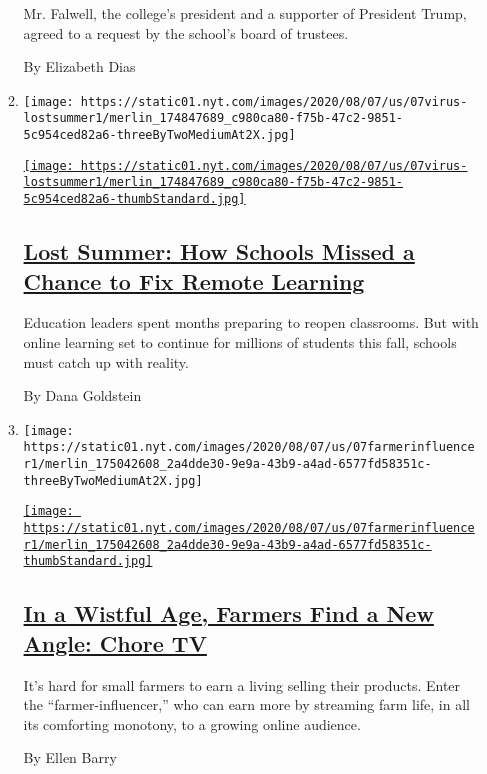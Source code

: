 \begin{enumerate}
\begin{enumerate}
    Mr. Falwell, the college's president and a supporter of President
    Trump, agreed to a request by the school's board of trustees.

    By Elizabeth Dias
  \item
    \texttt{[image: https://static01.nyt.com/images/2020/08/07/us/07virus-lostsummer1/merlin\_174847689\_c980ca80-f75b-47c2-9851-5c954ced82a6-threeByTwoMediumAt2X.jpg]}

    \href{/2020/08/07/us/remote-learning-fall-2020.html}{\texttt{[image: https://static01.nyt.com/images/2020/08/07/us/07virus-lostsummer1/merlin\_174847689\_c980ca80-f75b-47c2-9851-5c954ced82a6-thumbStandard.jpg]}}

    \hypertarget{lost-summer-how-schools-missed-a-chance-to-fix-remote-learning}{%
    \subsection{\texorpdfstring{\href{/2020/08/07/us/remote-learning-fall-2020.html}{Lost
    Summer: How Schools Missed a Chance to Fix Remote
    Learning}}{Lost Summer: How Schools Missed a Chance to Fix Remote Learning}}\label{lost-summer-how-schools-missed-a-chance-to-fix-remote-learning}}

    Education leaders spent months preparing to reopen classrooms. But
    with online learning set to continue for millions of students this
    fall, schools must catch up with reality.

    By Dana Goldstein
  \item
    \texttt{[image: https://static01.nyt.com/images/2020/08/07/us/07farmerinfluencer1/merlin\_175042608\_2a4dde30-9e9a-43b9-a4ad-6577fd58351c-threeByTwoMediumAt2X.jpg]}

    \href{/2020/08/07/us/farmer-influencer-youtube.html}{\texttt{[image: https://static01.nyt.com/images/2020/08/07/us/07farmerinfluencer1/merlin\_175042608\_2a4dde30-9e9a-43b9-a4ad-6577fd58351c-thumbStandard.jpg]}}

    \hypertarget{in-a-wistful-age-farmers-find-a-new-angle-chore-tv}{%
    \subsection{\texorpdfstring{\href{/2020/08/07/us/farmer-influencer-youtube.html}{In
    a Wistful Age, Farmers Find a New Angle: Chore
    TV}}{In a Wistful Age, Farmers Find a New Angle: Chore TV}}\label{in-a-wistful-age-farmers-find-a-new-angle-chore-tv}}

    It's hard for small farmers to earn a living selling their products.
    Enter the ``farmer-influencer,'' who can earn more by streaming farm
    life, in all its comforting monotony, to a growing online audience.

    By Ellen Barry
  \end{enumerate}
\end{enumerate}


